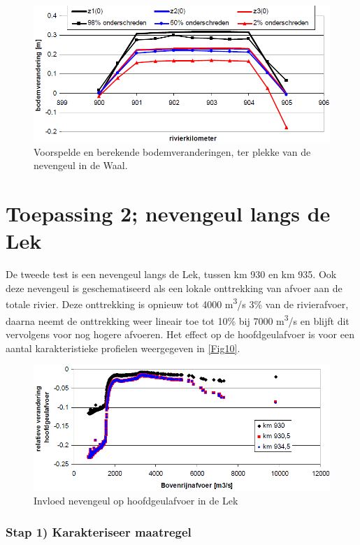 \begin{figure}
\includegraphics[width=\columnwidth]{figures/Fig9.png}
\caption{Voorspelde en berekende bodemveranderingen, ter plekke van de nevengeul in de Waal.}
\label{Fig9}
\end{figure}

\section{Toepassing 2; nevengeul langs de Lek}

De tweede test is een nevengeul langs de Lek, tussen km 930 en km 935.
Ook deze nevengeul is geschematiseerd als een lokale onttrekking van afvoer aan de totale rivier.
Deze onttrekking is opnieuw tot 4000 m\textsuperscript{3}/s 3\% van de rivierafvoer, daarna neemt de onttrekking weer lineair toe tot 10\% bij 7000 m\textsuperscript{3}/s en blijft dit vervolgens voor nog hogere afvoeren.
Het effect op de hoofdgeulafvoer is voor een aantal karakteristieke profielen weergegeven in \autoref{Fig10}.

\begin{figure}
\includegraphics[width=\columnwidth]{figures/Fig10.png}
\caption{Invloed nevengeul op hoofdgeulafvoer in de Lek}
\label{Fig10}
\end{figure}

\subsubsection*{Stap 1) Karakteriseer maatregel}

